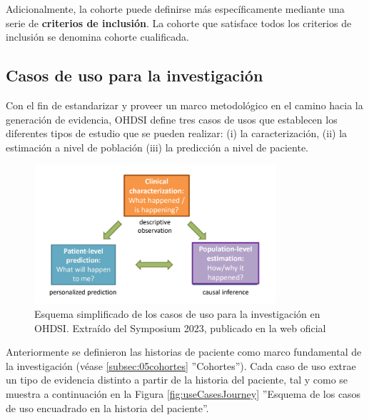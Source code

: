 Adicionalmente, la cohorte puede definirse más específicamente mediante una serie de \textbf{criterios de inclusión}. La cohorte que satisface todos los criterios de inclusión se denomina cohorte cualificada.

\subsection{Casos de uso para la investigación} \label{subsec:05casosUso}

Con el fin de estandarizar y proveer un marco metodológico en el camino hacia la generación de evidencia, OHDSI define tres casos de usos que establecen los diferentes tipos de estudio que se pueden realizar: (i) la caracterización, (ii) la estimación a nivel de población (iii) la predicción a nivel de paciente.

\begin{figure}[H]
\centering
\includegraphics[width=0.80\textwidth]{figures/useCases.png}
     \caption{Esquema simplificado de los casos de uso para la investigación en OHDSI. Extraído del Symposium 2023, publicado en la web oficial \cite{OHDSIwebsite}}
    \label{fig:useCases}
\end{figure}


Anteriormente se definieron las historias de paciente como marco fundamental de la investigación (véase \ref{subsec:05cohortes} ''Cohortes''). Cada caso de uso extrae un tipo de evidencia distinto a partir de la historia del paciente, tal y como se muestra a continuación en la Figura \ref{fig:useCasesJourney} ''Esquema de los casos de uso encuadrado en la historia del paciente''.


